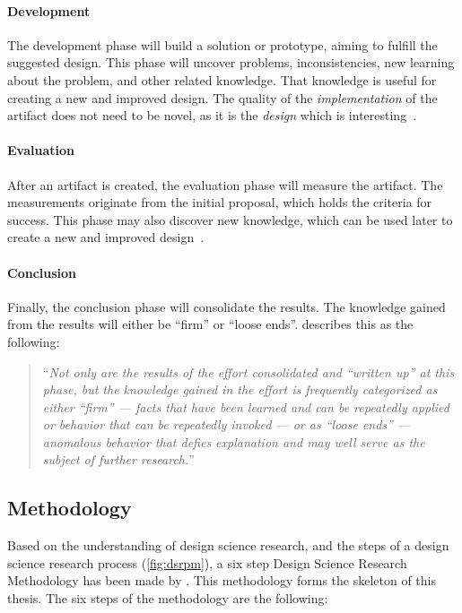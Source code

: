 \paragraph{Development}
The development phase will build a solution or prototype, aiming to fulfill the suggested design.
This phase will uncover problems, inconsistencies, new learning about the problem, and other related knowledge.
That knowledge is useful for creating a new and improved design.
The quality of the \textit{implementation} of the artifact does not need to be novel, as it is the \textit{design} which is interesting~\cite[p.~12]{vijayvaishnaviDesignScienceResearch2019}.


\paragraph{Evaluation}
After an artifact is created, the evaluation phase will measure the artifact.
The measurements originate from the initial proposal, which holds the criteria for success.
This phase may also discover new knowledge, which can be used later to create a new and improved design~\cite[p.~13]{vijayvaishnaviDesignScienceResearch2019}.


\paragraph{Conclusion}
Finally, the conclusion phase will consolidate the results.
The knowledge gained from the results will either be ``firm'' or ``loose ends''.
\Textcite[p.~13]{vijayvaishnaviDesignScienceResearch2019} describes this as the following:

\begin{quote}
``\textit{Not only are the results of the effort consolidated and ``written up'' at this phase, but the knowledge gained in the effort is frequently categorized as either ``firm'' --- facts that have been learned and can be repeatedly applied or behavior that can be repeatedly invoked --- or as ``loose ends'' --- anomalous behavior that defies explanation and may well serve as the subject of further research.}''
\end{quote}


\subsection{Methodology}

Based on the understanding of design science research, and the steps of a design science research process (\cref{fig:dsrpm}), a six step Design Science Research Methodology has been made by \textcite[p.~28-30]{alanhevnerDesignResearchInformation2010}.
This methodology forms the skeleton of this thesis.
The six steps of the methodology are the following:

